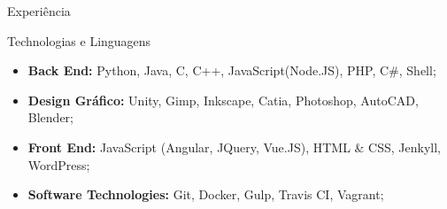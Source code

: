 \documentclass[]{fraguilarcv}
\begin{document}
\begin{cvsection}{Experiência}
	\begin{cvsection}{Technologias e Linguagens}
		\begin{cvsubsection}{}{}{}
			\begin{itemize}
				\item \textbf{Back End:} Python, Java, C, C++, JavaScript(Node.JS), PHP, C\#, Shell;
				\item \textbf{Design Gráfico:} Unity, Gimp, Inkscape, Catia, Photoshop, AutoCAD, Blender;
	      \item \textbf{Front End:} JavaScript (Angular, JQuery, Vue.JS), HTML \& CSS, Jenkyll, WordPress;
	      \item \textbf{Software Technologies:} Git, Docker, Gulp, Travis CI, Vagrant;
			\end{itemize}
		\end{cvsubsection}
	\end{cvsection}
\end{cvsection}
\end{document}
